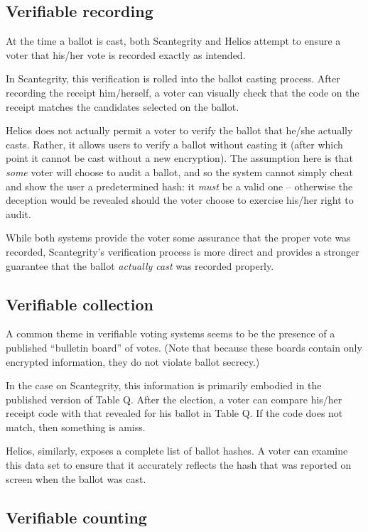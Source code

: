 \documentclass[10pt]{article}
\begin{document}
\begin{multicols}{2}
\subsection{Verifiable recording}

At the time a ballot is cast, both Scantegrity and Helios attempt to ensure a voter that his/her
vote is recorded exactly as intended.

In Scantegrity, this verification is rolled into the ballot casting process. After recording the
receipt him/herself, a voter can visually check that the code on the receipt matches the candidates
selected on the ballot.

Helios does not actually permit a voter to verify the ballot that he/she actually casts. Rather, it
allows users to verify a ballot without casting it (after which point it cannot be cast without
a new encryption). The assumption here is that \emph{some} voter will choose to audit a ballot, and
so the system cannot simply cheat and show the user a predetermined hash: it \emph{must} be a valid
one -- otherwise the deception would be revealed should the voter choose to exercise his/her right
to audit.

While both systems provide the voter some assurance that the proper vote was recorded, Scantegrity's
verification process is more direct and provides a stronger guarantee that the ballot \emph{actually
cast} was recorded properly.

\subsection{Verifiable collection}

A common theme in verifiable voting systems seems to be the presence of a published ``bulletin
board'' of votes. (Note that because these boards contain only encrypted information, they do not
violate ballot secrecy.)

In the case on Scantegrity, this information is primarily embodied in the published version of Table
Q. After the election, a voter can compare his/her receipt code with that revealed for his ballot in
Table Q. If the code does not match, then something is amiss.

Helios, similarly, exposes a complete list of ballot hashes. A voter can examine this data set to
ensure that it accurately reflects the hash that was reported on screen when the ballot was cast.

\subsection{Verifiable counting}


\end{multicols}
\end{document}
